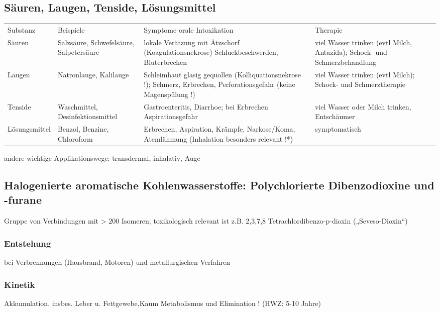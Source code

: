 \documentclass[10pt,a4paper]{report}
\begin{document}
\subsection{Säuren, Laugen, Tenside, Lösungsmittel} %
\label{sub:s_uren_laugen_tenside_l_sungsmittel}
\begin{tabularx}{\textwidth}{lXXX}
Substanz&Beispiele&Symptome orale Intoxikation&Therapie\\
Säuren&Salzsäure, Schwefelsäure, Salpetersäure&lokale Verätzung  mit Ätzschorf (Koagulationsnekrose) Schluckbeschwerden, Bluterbrechen&viel Wasser trinken (evtl Milch, Antazida); Schock- und Schmerzbehandlung\\
Laugen&Natronlauge, Kalilauge&Schleimhaut glasig gequollen (Kolliquationsnekrose !); Schmerz, Erbrechen, Perforationsgefahr (keine Magenspülung !)&viel Wasser trinken (evtl Milch); Schock- und Schmerztherapie\\
Tenside&Waschmittel, Desinfektionsmittel&Gastroenteritis, Diarrhoe; bei Erbrechen Aspirationsgefahr&viel Wasser oder Milch trinken, Entschäumer \\
Lösungsmittel&Benzol, Benzine, Chloroform&Erbrechen, Aspiration, Krämpfe, Narkose/Koma, Atemlähmung (Inhalation besonders relevant !*)&symptomatisch\\
\end{tabularx}
andere wichtige Applikationswege: transdermal, inhalativ, Auge
\subsection{Halogenierte aromatische Kohlenwasserstoffe: Polychlorierte Dibenzodioxine und -furane} %
\label{sub:halogenierte_aromatische_kohlenwasserstoffe_polychlorierte_dibenzodioxine_und_furane}
Gruppe von Verbindungen mit > 200 Isomeren; toxikologisch relevant ist z.B. 2,3,7,8 Tetrachlordibenzo-p-dioxin („Seveso-Dioxin“)
\subsubsection{Entstehung} %
\label{ssub:entstehung}
bei Verbrennungen (Hausbrand, Motoren) und metallurgischen Verfahren
\subsubsection{Kinetik} %
\label{ssub:kinetik}
Akkumulation, insbes. Leber u. Fettgewebe,Kaum Metabolismus und Elimination ! (HWZ: 5-10 Jahre)
\end{document}
